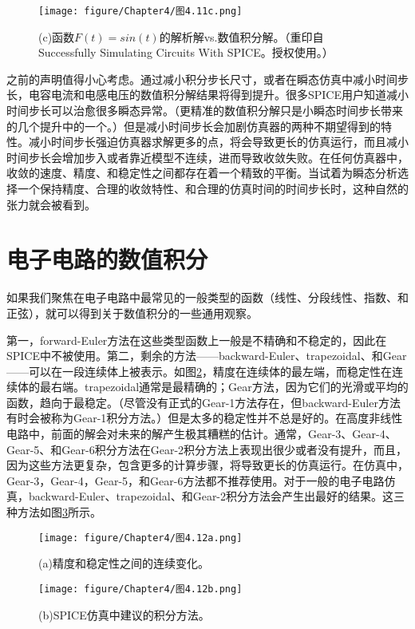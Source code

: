 \begin{figure}[htbp]
\small
    \centering
    \texttt{[image: figure/Chapter4/图4.11c.png]}
    \caption{(c)函数$F(t)=sin(t)$的解析解vs.数值积分解。（重印自Successfully Simulating Circuits With SPICE。授权使用。）}
    \label{图4.11c}
\end{figure}

之前的声明值得小心考虑。通过减小积分步长尺寸，或者在瞬态仿真中减小时间步长，电容电流和电感电压的数值积分解结果将得到提升。很多SPICE用户知道减小时间步长可以治愈很多瞬态异常。（更精准的数值积分解只是小瞬态时间步长带来的几个提升中的一个。）但是减小时间步长会加剧仿真器的两种不期望得到的特性。减小时间步长强迫仿真器求解更多的点，将会导致更长的仿真运行，而且减小时间步长会增加步入或者靠近模型不连续，进而导致收敛失败。在任何仿真器中，收敛的速度、精度、和稳定性之间都存在着一个精致的平衡。当试着为瞬态分析选择一个保持精度、合理的收敛特性、和合理的仿真时间的时间步长时，这种自然的张力就会被看到。

\section{电子电路的数值积分}
如果我们聚焦在电子电路中最常见的一般类型的函数（线性、分段线性、指数、和正弦），就可以得到关于数值积分的一些通用观察。

第一，forward-Euler方法在这些类型函数上一般是不精确和不稳定的，因此在SPICE中不被使用。第二，剩余的方法——backward-Euler、trapezoidal、和Gear
——可以在一段连续体上被表示。如图\ref{图4.12a}，精度在连续体的最左端，而稳定性在连续体的最右端。trapezoidal通常是最精确的；Gear方法，因为它们的光滑或平均的函数，趋向于最稳定。（尽管没有正式的Gear-1方法存在，但backward-Euler方法有时会被称为Gear-1积分方法。）但是太多的稳定性并不总是好的。在高度非线性电路中，前面的解会对未来的解产生极其糟糕的估计。通常，Gear-3、Gear-4、Gear-5、和Gear-6积分方法在Gear-2积分方法上表现出很少或者没有提升，而且，因为这些方法更复杂，包含更多的计算步骤，将导致更长的仿真运行。在仿真中，Gear-3，Gear-4，Gear-5，和Gear-6方法都不推荐使用。对于一般的电子电路仿真，backward-Euler、trapezoidal、和Gear-2积分方法会产生出最好的结果。这三种方法如图\ref{图4.12b}所示。

\begin{figure}[htbp]
\small
    \centering
    \texttt{[image: figure/Chapter4/图4.12a.png]}
    \caption{(a)精度和稳定性之间的连续变化。}
    \label{图4.12a}
\end{figure}

\begin{figure}[htbp]
\small
    \centering
    \texttt{[image: figure/Chapter4/图4.12b.png]}
    \caption{(b)SPICE仿真中建议的积分方法。}
    \label{图4.12b}
\end{figure}

